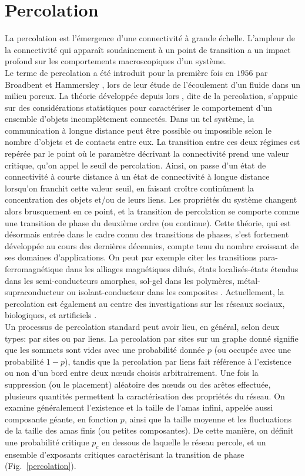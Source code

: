 \section{Percolation}
La percolation est l'émergence d'une connectivité à grande échelle. L'ampleur de la connectivité qui apparaît soudainement à un point de transition a un impact profond sur les comportements macroscopiques d'un système.\\
Le terme de percolation a  été introduit pour la première fois  en $1956$ par Broadbent et Hammersley \cite{Broadbent-Hammersley1957}, lors  de leur étude de l'écoulement d'un fluide  dans  un milieu poreux. La théorie développée depuis lors , dite de la percolation, s'appuie sur des considérations statistiques pour caractériser le comportement d'un ensemble d'objets incomplètement connectés. Dans un  tel système, la communication à longue distance peut être possible ou impossible selon le nombre d'objets et de contacts entre eux. La transition entre ces deux régimes est repérée par le point où  le paramètre décrivant la connectivité prend une valeur critique, qu'on appel le seuil  de percolation. Ainsi, on passe d'un  état de connectivité à courte distance à un état de connectivité à longue distance lorsqu'on franchit cette valeur seuil, en faisant croître continûment la concentration des objets et/ou de leurs liens. Les propriétés du système changent alors brusquement en ce point, et  la transition de percolation se comporte comme une transition de phase du deuxième ordre (ou continue). Cette théorie, qui est désormais entrée dans le cadre connu des transitions de phases, s'est fortement développée au cours des dernières décennies, compte tenu  du nombre croissant de  ses domaines d'applications. On peut par exemple citer les transitions para-ferromagnétique dans les alliages magnétiques dilués, états localisés-états étendus dans les semi-conducteurs amorphes, sol-gel dans les polymères, métal-supraconducteur ou isolant-conducteur dans les composites \cite{Stauffer1982}. Actuellement, la percolation est également au centre des investigations sur les réseaux sociaux, biologiques, et artificiels \cite{Newman-al2002,Dorogovtsev-al2008,Rozenfeld-al2010}.\\
Un processus de percolation standard peut avoir lieu, en général, selon deux types: par sites ou par liens. La percolation par sites sur un graphe donné signifie que les sommets sont vides avec une probabilité donnée $p$ (ou occupée avec une probabilité $1-p$), tandis que la percolation par liens fait référence à l’existence ou non d’un bord entre deux nœuds choisis arbitrairement. Une fois la suppression (ou le placement) aléatoire des nœuds ou des arêtes effectuée, plusieurs quantités permettent la caractérisation des propriétés du réseau.
On examine généralement l’existence et la taille de l'amas infini, appelée aussi composante géante, en fonction $p$, ainsi que la taille moyenne et les fluctuations de la taille des amas finis (ou petites composantes). De cette manière, on définit une probabilité critique $p_c$ en dessous de laquelle le réseau percole, et un ensemble d’exposants critiques caractérisant la transition de phase (Fig.~\ref{percolation}).

